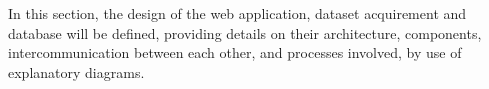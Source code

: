 In this section, the design of the web application, dataset acquirement and database will be defined, providing details on their architecture, components, intercommunication between each other, and processes involved, by use of explanatory diagrams.
